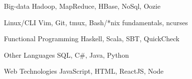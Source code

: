 

\begin{cvskills}

  \cvskill
    {Big-data}
    {Hadoop, MapReduce, HBase, NoSql, Oozie}

  \cvskill
    {Linux/CLI}
    {Vim, Git, tmux, Bash/*nix fundamentals, ncurses}

  \cvskill
    {Functional Programming}
    {Haskell, Scala, SBT, QuickCheck}

  \cvskill
    {Other Languages}
    {SQL, C\#, Java, Python}

  \cvskill
    {Web Technologies}
    {JavaScript, HTML, ReactJS, Node}

\end{cvskills}
